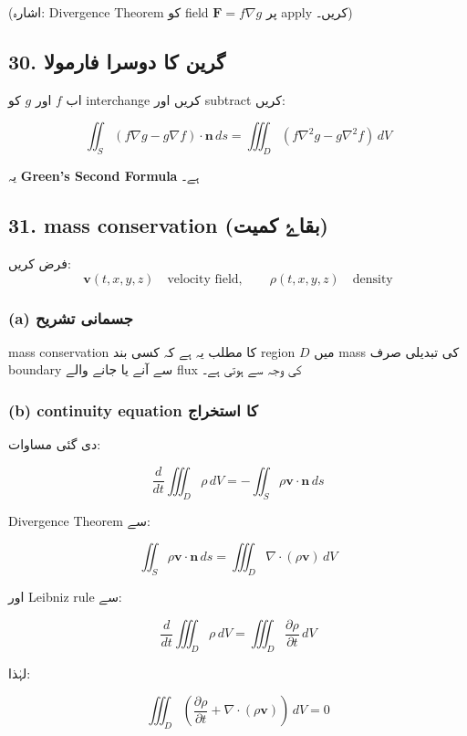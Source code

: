 \begin{enumerate}
(اشارہ: Divergence Theorem کو field \( \mathbf{F} = f \nabla g \) پر apply کریں۔)

\bigskip

\subsection*{30. گرین کا دوسرا فارمولا}

اب \( f \) اور \( g \) کو interchange کریں اور subtract کریں:

\[
\iint_S (f\nabla g - g\nabla f)\cdot \mathbf{n}\, ds
=
\iiint_D \left(f\nabla^2 g - g\nabla^2 f\right)\, dV
\]

یہ \textbf{Green’s Second Formula} ہے۔

\bigskip

\subsection*{31. mass conservation (بقاۓ کمیت)}

فرض کریں:
\[
\mathbf{v}(t,x,y,z) \quad \text{velocity field}, \qquad
\rho(t,x,y,z) \quad \text{density}
\]

\subsubsection*{(a) جسمانی تشریح}

mass conservation کا مطلب یہ ہے کہ کسی بند region \( D \) میں mass کی تبدیلی صرف boundary سے آنے یا جانے والے flux کی وجہ سے ہوتی ہے۔

\bigskip

\subsubsection*{(b) continuity equation کا استخراج}

دی گئی مساوات:

\[
\frac{d}{dt} \iiint_D \rho\, dV
=
-\iint_S \rho \mathbf{v}\cdot \mathbf{n}\, ds
\]

Divergence Theorem سے:

\[
\iint_S \rho \mathbf{v}\cdot \mathbf{n}\, ds
=
\iiint_D \nabla \cdot (\rho \mathbf{v})\, dV
\]

اور Leibniz rule سے:

\[
\frac{d}{dt} \iiint_D \rho\, dV
=
\iiint_D \frac{\partial \rho}{\partial t}\, dV
\]

لہٰذا:

\[
\iiint_D \left(
\frac{\partial \rho}{\partial t}
+
\nabla \cdot (\rho \mathbf{v})
\right)\, dV
= 0
\]


\end{enumerate}
